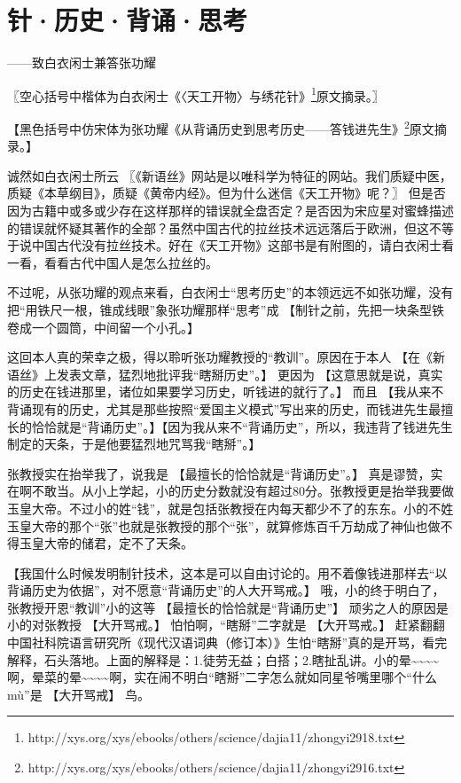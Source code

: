 \section{针·历史·背诵·思考}
\centerline{
	\yuesong ——致白衣闲士兼答张功耀
}

\mbox{}


\kaishu
〖空心括号中楷体为白衣闲士《〈天工开物〉与绣花针》\footnote{http://xys.org/xys/ebooks/others/science/dajia11/zhongyi2918.txt}原文摘录。〗

\fangsong
【黑色括号中仿宋体为张功耀《从背诵历史到思考历史——答钱进先生》\footnote{http://xys.org/xys/ebooks/others/science/dajia11/zhongyi2916.txt}原文摘录。】

\normalfont
诚然如白衣闲士所云
\kaishu
〖《新语丝》网站是以唯科学为特征的网站。我们质疑中医，质疑《本草纲目》，质疑《黄帝内经》。但为什么迷信《天工开物》呢？〗
\normalfont
但是否因为古籍中或多或少存在这样那样的错误就全盘否定？是否因为宋应星对蜜蜂描述的错误就怀疑其著作的全部？虽然中国古代的拉丝技术远远落后于欧洲，但这不等于说中国古代没有拉丝技术。好在《天工开物》这部书是有附图的，请白衣闲士看一看，看看古代中国人是怎么拉丝的。

不过呢，从张功耀的观点来看，白衣闲士“思考历史”的本领远远不如张功耀，没有把“用铁尺一根，锥成线眼”象张功耀那样“思考”成
\fangsong
【制针之前，先把一块条型铁卷成一个圆筒，中间留一个小孔。】

\normalfont
这回本人真的荣幸之极，得以聆听张功耀教授的“教训”。原因在于本人
\fangsong
【在《新语丝》上发表文章，猛烈地批评我“瞎掰历史”。】
\normalfont
更因为
\fangsong
【这意思就是说，真实的历史在钱进那里，诸位如果要学习历史，听钱进的就行了。】
\normalfont
而且
\fangsong
【我从来不背诵现有的历史，尤其是那些按照“爱国主义模式”写出来的历史，而钱进先生最擅长的恰恰就是“背诵历史”。】【因为我从来不“背诵历史”，所以，我违背了钱进先生制定的天条，于是他要猛烈地咒骂我“瞎掰”。】

\normalfont
张教授实在抬举我了，说我是
\fangsong
【最擅长的恰恰就是“背诵历史”。】
\normalfont
真是谬赞，实在啊不敢当。从小上学起，小的历史分数就没有超过80分。张教授更是抬举我要做玉皇大帝。不过小的姓“钱”，就是包括张教授在内每天都少不了的东东。小的不姓玉皇大帝的那个“张”也就是张教授的那个“张”，就算修炼百千万劫成了神仙也做不得玉皇大帝的储君，定不了天条。

\fangsong
【我国什么时候发明制针技术，这本是可以自由讨论的。用不着像钱进那样去“以背诵历史为依据”，对不愿意“背诵历史”的人大开骂戒。】
\normalfont
哦，小的终于明白了，张教授开恩“教训”小的这等
\fangsong
【最擅长的恰恰就是“背诵历史”】
\normalfont
顽劣之人的原因是小的对张教授
\fangsong
【大开骂戒。】
\normalfont
怕怕啊，“瞎掰”二字就是
\fangsong
【大开骂戒。】
\normalfont
赶紧翻翻中国社科院语言研究所《现代汉语词典（修订本）》生怕“瞎掰”真的是开骂，看完解释，石头落地。上面的解释是：1.徒劳无益；白搭；2.瞎扯乱讲。小的晕\~{}\~{}\~{}\~{}啊，晕菜的晕\~{}\~{}\~{}\~{}啊，实在闹不明白“瞎掰”二字怎么就如同星爷嘴里哪个“什么mù”是
\fangsong
【大开骂戒】
\normalfont
鸟。

